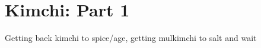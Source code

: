 \chapter*{Kimchi: Part 1}
\renewcommand{\chaptertitle}{Kimchi: Part 1}

Getting baek kimchi to spice/age, getting mulkimchi to salt and wait
